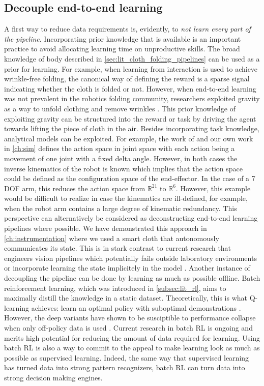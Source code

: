 \documentclass[\home/main.tex]{subfiles}
\begin{document}
\subsection{Decouple end-to-end learning}
A first way to reduce data requirements is, evidently, to \emph{not learn every part of the pipeline}. Incorporating prior knowledge that is available is an important practice to avoid allocating learning time on unproductive skills.
The broad knowledge of body described in \cref{sec:lit_cloth_folding_pipelines} can be used as a prior for learning. For example, when learning from interaction is used to achieve wrinkle-free folding, the canonical way of defining the reward is a sparse signal indicating whether the cloth is folded or not. However, when end-to-end learning was not prevalent in the robotics folding community, researchers exploited gravity as a way to unfold clothing and remove wrinkles \autocite{Doumanoglou2016,Maitin2010}. This prior knowledge of exploiting gravity can be structured into the reward or task by driving the agent towards lifting the piece of cloth in the air.
Besides incorporating task knowledge, analytical models can be exploited. For example, the work of \textcite{Zhang2015} and our own work in \cref{ch:sim} defines the action space in joint space with each action being a movement of one joint with a fixed delta angle. However, in both cases the inverse kinematics of the robot is known which implies that the action space could be defined as the configuration space of the end-effector. In the case of a 7 \gls{DOF} arm, this reduces the action space from $\mathbb{R}^{21}$ to $\mathbb{R}^6$. However, this example would be difficult to realize in case the kinematics are ill-defined, for example, when the robot arm contains a large degree of kinematic redundancy. 
This perspective can alternatively be considered as deconstructing end-to-end learning pipelines where possible. We have demonstrated this approach in \cref{ch:instrumentation} where we used a smart cloth that autonomously communicates its state. This is in stark contrast to current research that engineers vision pipelines \autocite{Wu2020} which potentially fails outside laboratory environments or incorporate learning the state implicitely in the model \autocite{Matas2018}. 
Another instance of decoupling the pipeline can be done by learning as much as possible offline. Batch reinforcement learning, which was introduced in \cref{subsec:lit_rl}, aims to maximally distill the knowledge in a static dataset. Theoretically, this is what Q-learning achieves: learn an optimal policy with suboptimal demonstrations \autocite{Sutton2018}. However, the deep variants have shown to be susciptible to performance collapse when only off-policy data is used \autocite{hausknecht2016policy}. Current research in batch RL is ongoing and merits high potential for reducing the amount of data required for learning. Using batch RL is also a way to commit to the appeal to make learning look as much as possible as supervised learning. Indeed, the same way that supervised learning has turned data into strong pattern recognizers, batch RL can turn data into strong decision making engines. 
\end{document}
